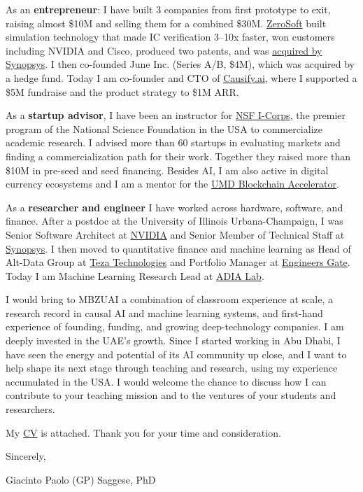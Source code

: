 \documentclass[10pt, letterpaper]{article}
\begin{document}
  As an \textbf{entrepreneur}: I have built 3 companies from first prototype to
  exit, raising almost \$10M and selling them for a combined \$30M.
  \href{https://www.crunchbase.com/organization/zerosoft}{ZeroSoft} built
  simulation technology that made IC verification 3--10x faster, won customers
  including NVIDIA and Cisco, produced two patents, and was
  \href{https://mergr.com/synopsys-acquires-zerosoft}{acquired by Synopsys}. I
  then co-founded June Inc. (Series A/B, \$4M), which was acquired by a hedge
  fund. Today I am co-founder and CTO of \href{https://causify.ai}{Causify.ai},
  where I supported a \$5M fundraise and the product strategy to \$1M ARR.

  As a \textbf{startup advisor}, I have been an instructor for
  \href{https://www.nsf.gov/funding/initiatives/i-corps}{NSF I-Corps}, the
  premier program of the National Science Foundation in the USA to commercialize
  academic research. I advised more than 60 startups in evaluating markets and
  finding a commercialization path for their work. Together they raised more
  than \$10M in pre-seed and seed financing. Besides AI, I am also active in
  digital currency ecosystems and I am a mentor for the
  \href{https://www.rhsmith.umd.edu/centers-initiatives/supply-chain-management-center/initiatives-programs/blockchain-accelerator}{UMD
  Blockchain Accelerator}.

  As a \textbf{researcher and engineer} I have worked across hardware,
  software, and finance. After a postdoc at the University of Illinois
  Urbana-Champaign, I was Senior Software Architect at
  \href{https://www.nvidia.com/en-us/}{NVIDIA} and Senior Member of Technical
  Staff at \href{https://www.synopsys.com/}{Synopsys}. I then moved to
  quantitative finance and machine learning as Head of Alt-Data Group at
  \href{https://www.teza.com/}{Teza Technologies} and Portfolio Manager at
  \href{https://www.eglp.com/}{Engineers Gate}. Today I am Machine Learning
  Research Lead at \href{https://www.adialab.ae/}{ADIA Lab}.

  I would bring to MBZUAI a combination of classroom experience at scale, a
  research record in causal AI and machine learning systems, and first-hand
  experience of founding, funding, and growing deep-technology companies. I am
  deeply invested in the UAE's growth. Since I started working in Abu Dhabi, I
  have seen the energy and potential of its AI community up close, and I want to
  help shape its next stage through teaching and research, using my experience
  accumulated in the USA. I would welcome the chance to discuss how I can
  contribute to your teaching mission and to the ventures of your students and
  researchers.

  My \href{https://gpsaggese.github.io/02_cv/}{CV} is attached. Thank you for
  your time and consideration.

  Sincerely,

  Giacinto Paolo (GP) Saggese, PhD
\end{document}
